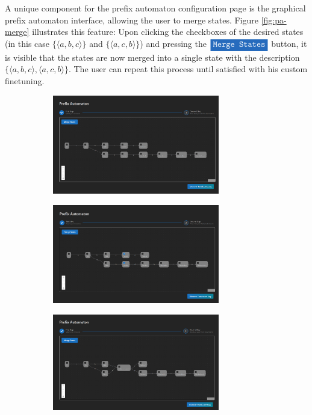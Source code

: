 A unique component for the prefix automaton configuration page is the graphical prefix automaton interface, allowing the user to merge states. Figure \ref{fig:pa-merge} illustrates this feature: Upon clicking the checkboxes of the desired states (in this case $\{ \langle a, b, c \rangle \}$ and $\{ \langle a, c, b \rangle \}$) and pressing the $\colorbox{NavyBlue}{\textcolor{white}{\texttt{Merge States}}}$ button, it is visible that the states are now merged into a single state with the description $\{ \langle a, b, c \rangle, \langle a, c, b \rangle \}$. The user can repeat this process until satisfied with his custom finetuning.

\begin{figure}[H]
    \centering
    \begin{subfigure}[b]{\textwidth}
        \centering
        \includegraphics[width=0.8\textwidth]{figures/screenshots/paconfig.png}
    \end{subfigure}
    \begin{subfigure}[b]{\textwidth}
        \centering
        \includegraphics[width=0.8\textwidth]{figures/screenshots/paconfigmerging.png}
    \end{subfigure}
    \begin{subfigure}[b]{\textwidth}
        \centering
        \includegraphics[width=0.8\textwidth]{figures/screenshots/paconfigmerged.png}

\end{subfigure}
\end{figure}
